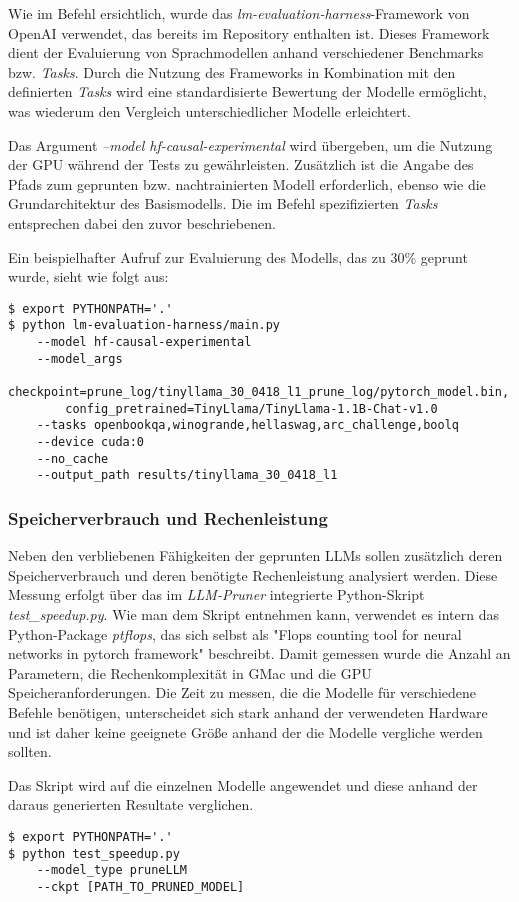 Wie im Befehl ersichtlich, wurde das \emph{lm-evaluation-harness}-Framework von
OpenAI verwendet, das bereits im Repository enthalten ist. Dieses Framework
dient der Evaluierung von Sprachmodellen anhand verschiedener Benchmarks bzw.
\emph{Tasks}. Durch die Nutzung des Frameworks in Kombination mit den
definierten \emph{Tasks} wird eine standardisierte Bewertung der Modelle
ermöglicht, was wiederum den Vergleich unterschiedlicher Modelle erleichtert.

Das Argument \emph{--model hf-causal-experimental} wird übergeben, um die
Nutzung der GPU während der Tests zu gewährleisten. Zusätzlich ist die Angabe
des Pfads zum geprunten bzw. nachtrainierten Modell erforderlich, ebenso wie die
Grundarchitektur des Basismodells. Die im Befehl spezifizierten \emph{Tasks}
entsprechen dabei den zuvor beschriebenen.

Ein beispielhafter Aufruf zur Evaluierung des Modells, das zu 30\% geprunt wurde,
sieht wie folgt aus:

\vspace{1em}
\begin{lstlisting}
$ export PYTHONPATH='.'
$ python lm-evaluation-harness/main.py
    --model hf-causal-experimental
    --model_args
        checkpoint=prune_log/tinyllama_30_0418_l1_prune_log/pytorch_model.bin,
        config_pretrained=TinyLlama/TinyLlama-1.1B-Chat-v1.0
    --tasks openbookqa,winogrande,hellaswag,arc_challenge,boolq
    --device cuda:0
    --no_cache
    --output_path results/tinyllama_30_0418_l1
\end{lstlisting}

\subsubsection{Speicherverbrauch und Rechenleistung}

Neben den verbliebenen Fähigkeiten der geprunten LLMs sollen zusätzlich deren
Speicherverbrauch und deren benötigte Rechenleistung analysiert werden. Diese
Messung erfolgt über das im \emph{LLM-Pruner} integrierte Python-Skript
\emph{test\_speedup.py}. Wie man dem Skript entnehmen kann, verwendet es intern
das Python-Package \emph{ptflops}, das sich selbst als "Flops counting tool for
neural networks in pytorch framework"\autocite[Vgl.][]{ptflops} beschreibt.
Damit gemessen wurde die Anzahl an Parametern, die Rechenkomplexität in GMac
und die GPU Speicheranforderungen. Die Zeit zu messen, die die Modelle für
verschiedene Befehle benötigen, unterscheidet sich stark anhand der verwendeten
Hardware und ist daher keine geeignete Größe anhand der die Modelle vergliche
werden sollten.

Das Skript wird auf die einzelnen Modelle angewendet und diese anhand der daraus
generierten Resultate verglichen.

\vspace{1em}
\begin{lstlisting}
$ export PYTHONPATH='.'
$ python test_speedup.py
    --model_type pruneLLM
    --ckpt [PATH_TO_PRUNED_MODEL]
\end{lstlisting}

\newpage
